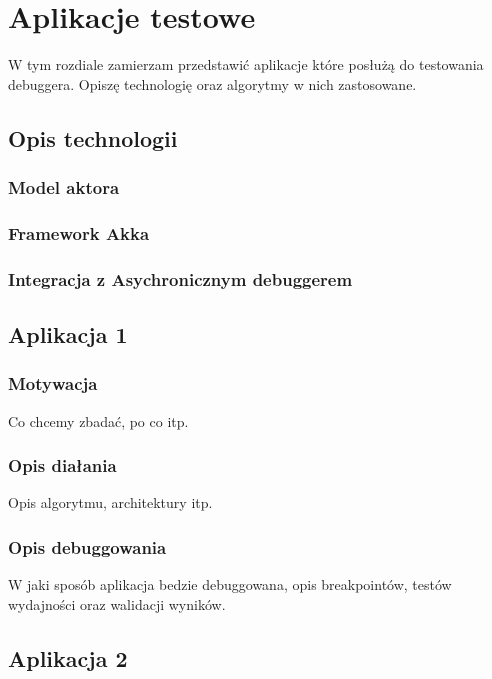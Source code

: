 \chapter{Aplikacje testowe}

W tym rozdiale zamierzam przedstawić aplikacje które posłużą do testowania debuggera. Opiszę technologię oraz algorytmy w nich zastosowane. 

\section{Opis technologii}

\subsection{Model aktora}

\subsection{Framework Akka}

\subsection{Integracja z Asychronicznym debuggerem}

\section{Aplikacja 1}

\subsection{Motywacja}

Co chcemy zbadać, po co itp.

\subsection{Opis diałania}

Opis algorytmu, architektury itp.

\subsection{Opis debuggowania}

W jaki sposób aplikacja bedzie debuggowana, opis breakpointów, testów wydajności oraz walidacji wyników.

\section{Aplikacja 2}

